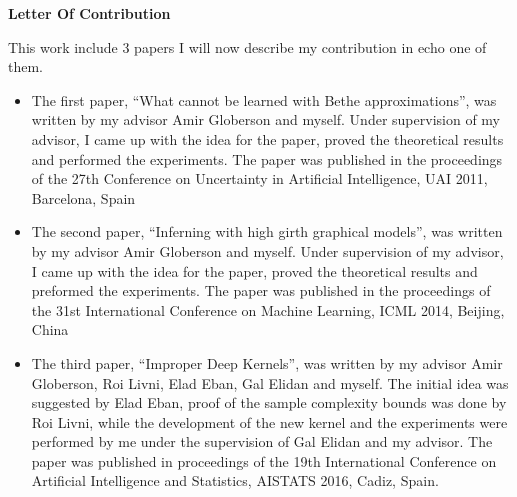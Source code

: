 \begin{center}
 \textbf{ Letter Of Contribution}\\[1cm]
\end{center}
This work include 3 papers I will now describe my contribution in echo one of them.
\begin{itemize}
\item
  The first paper, ``What cannot be learned with Bethe approximations'', was written by my advisor Amir Globerson and myself.
  Under supervision of my advisor, I came up with the idea for the paper, proved the theoretical results and performed the experiments.
  The paper was published in the proceedings of the 27th Conference on Uncertainty in Artificial Intelligence, UAI 2011, Barcelona, Spain
\item
  The second paper, ``Inferning with high girth graphical models'', was written by my advisor Amir Globerson and myself.
  Under supervision of my advisor, I came up with the idea for the paper, proved the theoretical results and preformed the experiments.
  The paper was published in the proceedings of the 31st International Conference on Machine Learning, ICML 2014, Beijing, China
\item
  The third paper, ``Improper Deep Kernels'', was written by my advisor Amir Globerson, Roi Livni, Elad Eban, Gal Elidan and myself.
  The initial idea was suggested by Elad Eban, proof of the sample complexity bounds was done by Roi Livni, while the development of the new kernel and the experiments were performed by me under the supervision of Gal Elidan and my advisor.
  The paper was published in proceedings of the 19th International Conference on Artificial Intelligence and Statistics, AISTATS 2016, Cadiz, Spain.
\end{itemize}
